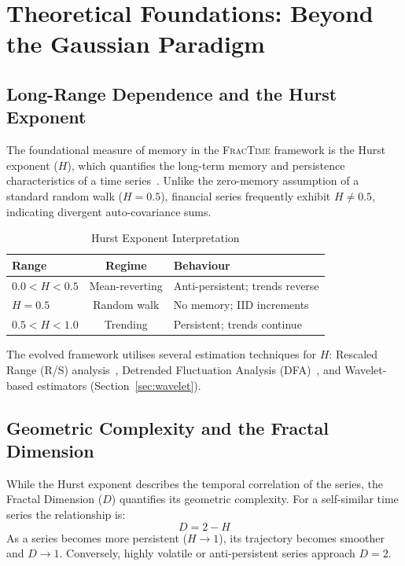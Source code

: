 \documentclass[12pt,a4paper]{article}
\begin{document}
\section{Theoretical Foundations: Beyond the Gaussian Paradigm}
\label{sec:theory}

\subsection{Long-Range Dependence and the Hurst Exponent}
\label{sec:hurst}

The foundational measure of memory in the \textsc{FracTime} framework is the
Hurst exponent ($H$), which quantifies the long-term memory and persistence
characteristics of a time series~\citep{Hurst1951}.  Unlike the zero-memory
assumption of a standard random walk ($H = 0.5$), financial series frequently
exhibit $H \neq 0.5$, indicating divergent auto-covariance sums.

\begin{table}[htbp]
  \centering
  \caption{Hurst Exponent Interpretation}
  \label{tab:hurst_interpretation}
  \begin{tabular}{lcl}
    \toprule
    \textbf{Range} & \textbf{Regime} & \textbf{Behaviour} \\
    \midrule
    $0.0 < H < 0.5$ & Mean-reverting & Anti-persistent; trends reverse \\
    $H = 0.5$        & Random walk    & No memory; IID increments \\
    $0.5 < H < 1.0$ & Trending       & Persistent; trends continue \\
    \bottomrule
  \end{tabular}
\end{table}

The evolved framework utilises several estimation techniques for $H$:
Rescaled Range (R/S) analysis~\citep{Hurst1951}, Detrended Fluctuation
Analysis (DFA)~\citep{Peng1994}, and Wavelet-based estimators
(Section~\ref{sec:wavelet}).

\subsection{Geometric Complexity and the Fractal Dimension}
\label{sec:fracdim}

While the Hurst exponent describes the temporal correlation of the series,
the Fractal Dimension ($D$) quantifies its geometric complexity.  For a
self-similar time series the relationship is:
\begin{equation}
  D = 2 - H
  \label{eq:hurst_dim}
\end{equation}
As a series becomes more persistent ($H \to 1$), its trajectory becomes
smoother and $D \to 1$.  Conversely, highly volatile or anti-persistent
series approach $D = 2$.
\end{document}
